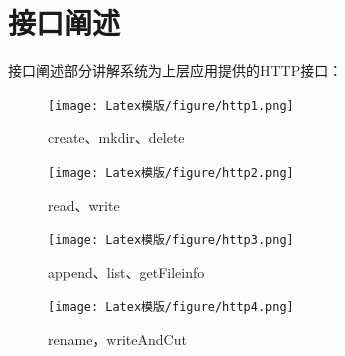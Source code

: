 \documentclass[UTF8]{ctexart}
\begin{document}
\section{接口阐述}
接口阐述部分讲解系统为上层应用提供的HTTP接口：
\begin{figure}[h]
    \centering
    \texttt{[image: Latex模版/figure/http1.png]}
    \caption{create、mkdir、delete}
\end{figure}
\begin{figure}[h]
    \centering
    \texttt{[image: Latex模版/figure/http2.png]}
	\caption{read、write}
\end{figure}
\begin{figure}[h]
    \centering
    \texttt{[image: Latex模版/figure/http3.png]}
	\caption{append、list、getFileinfo}
\end{figure}
\begin{figure}[h]
    \centering
    \texttt{[image: Latex模版/figure/http4.png]}
	\caption{rename，writeAndCut}
\end{figure}
\end{document}
